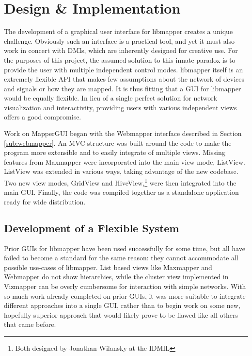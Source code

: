 \chapter{Design \& Implementation}

	The development of a graphical user interface for libmapper creates a unique challenge. Obviously such an interface is a practical tool, and yet it must also work in concert with DMIs, which are inherently designed for creative use. For the purposes of this project, the assumed solution to this innate paradox is to provide the user with multiple independent control modes. libmapper itself is an extremely flexible API that makes few assumptions about the network of devices and signals or how they are mapped. It is thus fitting that a GUI for libmapper would be equally flexible. In lieu of a single perfect solution for network visualization and interactivity, providing users with various independent views offers a good compromise.

	Work on MapperGUI began with the Webmapper interface described in Section \ref{sub:webmapper}. An MVC structure was built around the code to make the program more extensible and to easily integrate of multiple views. Missing features from Maxmapper were incorporated into the main view mode, ListView. ListView was extended in various ways, taking advantage of the new codebase. Two new view modes, GridView and HiveView,\footnote{Both designed by Jonathan Wilansky at the IDMIL} were then integrated into the main GUI. Finally, the code was compiled together as a standalone application ready for wide distribution.

\section{Development of a Flexible System} %
\label{sec:development_of_a_flexible_system}

Prior GUIs for libmapper have been used successfully for some time, but all have failed to become a standard for the same reason: they cannot accommodate all possible use-cases of libmapper. List based views like Maxmapper and Webmapper do not show hierarchies, while the cluster view implemented in Vizmapper can be overly cumbersome for interaction with simple networks. With so much work already completed on prior GUIs, it was more suitable to integrate different approaches into a single GUI, rather than to begin work on some new, hopefully superior approach that would likely prove to be flawed like all others that came before. 

